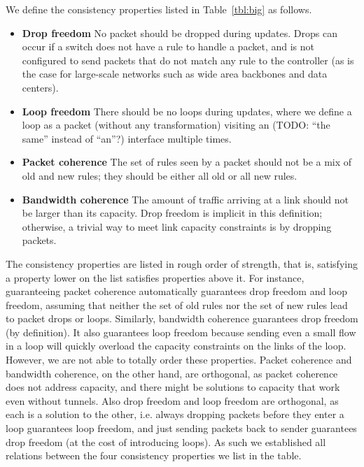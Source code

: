 We define the consistency properties listed in Table~\ref{tbl:big} as follows.

\begin{itemize}

\item
\textbf{Drop freedom} No packet should be dropped during updates. Drops can occur if a switch does not have a rule to handle a packet, and is not configured to send packets that do not match any rule to the controller (as is the case for large-scale networks such as wide area backbones and data centers).

\item
\textbf{Loop freedom} There should be no loops during updates, where we define a loop as a packet (without any transformation) visiting an (TODO: ``the same'' instead of ``an''?) interface multiple times.

\item
\textbf{Packet coherence} The set of rules seen by a packet should not be a mix of old and new rules; they should be either all old or all new rules.

\item
\textbf{Bandwidth coherence} The amount of traffic arriving at a link should not be larger than its capacity. Drop freedom is implicit in this definition; otherwise, a trivial way to meet link capacity constraints is by dropping packets.

\end{itemize}

The consistency properties are listed in rough order of strength, that is, satisfying a property lower on the list satisfies properties above it. For instance, guaranteeing packet coherence automatically guarantees drop freedom and loop freedom, assuming that neither the set of old rules nor the set of new rules lead to packet drops or loops. Similarly, bandwidth coherence guarantees drop freedom (by definition). It also guarantees loop freedom because sending even a small flow in a loop will quickly overload the capacity constraints on the links of the loop.  However, we are not able to totally order these properties. Packet coherence and bandwidth coherence, on the other hand, are orthogonal, as packet coherence does not address capacity, and there might be solutions to capacity that work even without tunnels. Also drop freedom and loop freedom are orthogonal, as each is a solution to the other, i.e. always dropping packets before they enter a loop guarantees loop freedom, and just sending packets back to sender guarantees drop freedom (at the cost of introducing loops). As such we established all relations between the four consistency properties we list in the table. 

